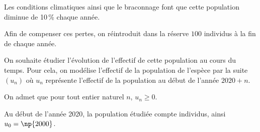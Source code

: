 \documentclass[11pt]{article}
\begin{document}
Les conditions climatiques ainsi que le braconnage font que cette population diminue de 10\,\% chaque année.

Afin de compenser ces pertes, on réintroduit dans la réserve $100$ individus à la fin de chaque année.

On souhaite étudier l'évolution de l'effectif de cette population au cours du temps. Pour cela, on modélise l'effectif de la population de l'espèce par la suite $\left(u_n\right)$ où $u_n$ représente l'effectif de la population au début de l'année $2020 + n$. 

On admet que pour tout entier naturel $n$,\: $u_n \geqslant 0$.

Au début de l'année 2020, la population étudiée compte  individus, ainsi $u_0 = \np{2000}$.

\medskip
\end{document}
